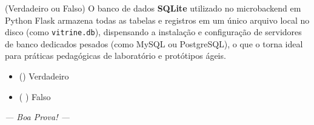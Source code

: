 \begin{tcolorbox}[colback=white, colframe=azulTitulo, title=\textbf{Questão 15: Integração Frontend-Backend com Flask e SQLite}]
    (Verdadeiro ou Falso) O banco de dados \textbf{SQLite} utilizado no microbackend em Python Flask armazena todas as tabelas e registros em um único arquivo local no disco (como \texttt{vitrine.db}), dispensando a instalação e configuração de servidores de banco dedicados pesados (como MySQL ou PostgreSQL), o que o torna ideal para práticas pedagógicas de laboratório e protótipos ágeis.
    \begin{itemize}
        \item () Verdadeiro
        \item ( ) Falso
    \end{itemize}
\end{tcolorbox}

\vspace{0.4cm}
\begin{center}
    \small\textit{--- Boa Prova! ---}
\end{center}



